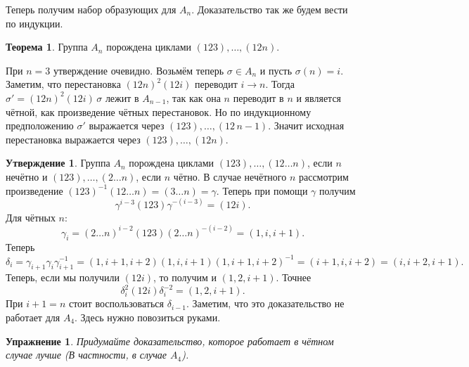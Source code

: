 \documentclass[10pt,a4paper,oneside]{book}
\newtheorem{uprz}{\color{violet!100!black} Упражнение}
\theoremstyle{definition}
\newtheorem{thm}{\color{red!40!black}Теорема}
\newtheorem{utvr}{\color{blue!50!black}Утверждение}
\def\thrm{\begin{thm}}
\def\ethrm{\end{thm}}
\def\utv{\begin{utvr}}
\def\eutv{\end{utvr}}
\def\upr{\begin{uprz}}
\def\eupr{\end{uprz}}
\begin{document}
Теперь получим набор образующих для $A_n$. Доказательство так же будем вести по индукции.


\thrm Группа $A_n$ порождена циклами $(123),\dots,(12n)$. 
\ethrm
\proof При $n=3$ утверждение очевидно. Возьмём теперь $\sigma\in A_n$ и пусть $\sigma(n)=i$. Заметим, что перестановка $(12n)^2(12i)$ переводит $i\to n$. Тогда $\sigma'=(12n)^2(12i) \,\sigma$ лежит в  $A_{n-1}$, так как она $n$ переводит в $n$ и является чётной, как произведение чётных перестановок. Но по индукционному предположению $\sigma'$ выражается через $(123),\dots,(12\,n-1)$. Значит исходная перестановка выражается через $(123),\dots,(12n)$.
\endproof


\utv Группа $A_n$ порождена циклами $(123),\dots,(12\dots n)$, если $n$ нечётно  и  $(123),\dots,(2\dots n)$, если $n$ чётно.
\proof В случае нечётного $n$ рассмотрим произведение $(123)^{-1}(12\dots n)=(3\dots n )= \gamma$. Теперь при помощи $\gamma$ получим 
$$\gamma^{i-3}(123)\gamma^{-(i-3)}=(12i).$$
Для чётных $n$:
$$\gamma_i= (2\dots n)^{i-2} (123)(2\dots n)^{-(i-2)}=(1, i,i+1).$$
Теперь 
$$\delta_i=\gamma_{i+1}\gamma_i \gamma_{i+1}^{-1}= (1, i+1,i+2)(1, i,i+1)(1, i+1,i+2)^{-1}=(i+1,i,i+2)=(i,i+2,i+1).$$
Теперь, если мы получили $(12i)$, то получим и $(1,2, i+1)$. Точнее
$$\delta_i^2 (12i)\delta_i^{-2}=(1,2,i+1).$$
При $i+1=n$ стоит воспользоваться $\delta_{i-1}$. Заметим, что это доказательство не работает для $A_4$. Здесь нужно повозиться руками.
\endproof
\eutv


\upr Придумайте доказательство, которое работает в чётном случае лучше (В частности, в случае $A_4$).
\eupr





















\end{document}
